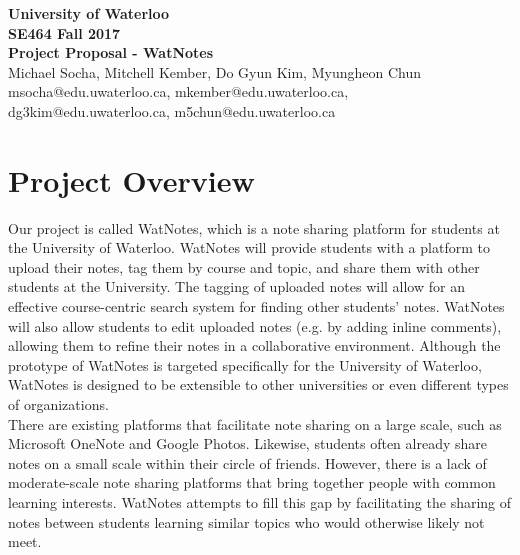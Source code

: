 \documentclass[12pt]{article}
\begin{document}
  \begin{center}
  \vspace*{\fill}
  {\Large\bf University of Waterloo}\\
  \vspace{3mm}
  {\large\bf SE464 Fall 2017}\\
  \vspace{3mm}
  {\Large\bf Project Proposal - WatNotes}\\
  \vspace{5mm}
  Michael Socha, Mitchell Kember, Do Gyun Kim, Myungheon Chun\\
  \vspace{3mm}
  msocha@edu.uwaterloo.ca, mkember@edu.uwaterloo.ca, dg3kim@edu.uwaterloo.ca, m5chun@edu.uwaterloo.ca\\
  \vspace*{\fill}
  \end{center}

  \newpage

  \section{Project Overview}
  Our project is called WatNotes, which is a note sharing platform for students at the University of Waterloo. WatNotes will provide students with a platform to upload their notes, tag them by course and topic, and share them with other students at the University. The tagging of uploaded notes will allow for an effective course-centric search system for finding other students' notes. WatNotes will also allow students to edit uploaded notes (e.g. by adding inline comments), allowing them to refine their notes in a collaborative environment. Although the prototype of WatNotes is targeted specifically for the University of Waterloo, WatNotes is designed to be extensible to other universities or even different types of organizations. \\

  There are existing platforms that facilitate note sharing on a large scale, such as Microsoft OneNote and Google Photos. Likewise, students often already share notes on a small scale within their circle of friends. However, there is a lack of moderate-scale note sharing platforms that bring together people with common learning interests. WatNotes attempts to fill this gap by facilitating the sharing of notes between students learning similar topics who would otherwise likely not meet. \\
\end{document}
